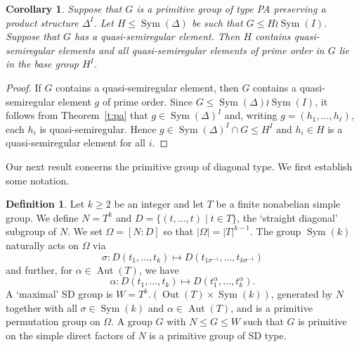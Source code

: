\documentclass{article}
\newtheorem{cor}[thm]{Corollary}
\theoremstyle{remark}
\theoremstyle{definition}
\newtheorem{defn}[thm]{Definition}
\DeclareMathOperator{\Sym}{Sym}
\DeclareMathOperator{\Aut}{Aut}
\DeclareMathOperator{\Out}{Out}
\newcommand{\qsr}{quasi-semiregular}
\newcommand{\qsre}{quasi-semiregular element}
\newcommand{\qsres}{quasi-semiregular elements}
\begin{document}
\begin{cor}
\label{cor: pa groups}
Suppose that $G$ is a primitive group of type PA preserving a product structure $\Delta^I$. Let $H\leqslant \Sym(\Delta)$ be such that $G \leqslant H \wr \Sym(I)$. Suppose that $G$ has a {\qsre}. Then $H$ contains {\qsres} and all {\qsres} of prime order in $G$ lie in the base group $H^I$.
\end{cor}
\begin{proof}
 If $G$ contains a {\qsre}, then $G$ contains a  {\qsre} $g$ of prime order. Since $G \leqslant \Sym(\Delta)\wr \Sym(I)$, it follows from Theorem~\ref{t:pa} that   $g\in \Sym(\Delta)^I$ and, writing $g=(h_1,\ldots,h_\ell)$, each $h_i$ is {\qsr}. Hence $g\in \Sym(\Delta)^I \cap G \leqslant H^I$ and $h_i \in H$ is a {\qsre} for all $i$.
\end{proof}



Our next result concerns the primitive group of diagonal type. We first establish some notation.

\begin{defn}
Let $k\geqslant 2$ be an integer and let $T$ be a finite nonabelian simple group. We define $N=T^k$ and $D=\{(t,\ldots,t) \mid t \in T\}$, the `straight diagonal' subgroup of $N$. We set $\Omega =[N:D]$ so that $|\Omega|=|T|^{k-1}$. The group $\Sym(k)$ naturally acts on $\Omega$  via
$$\sigma  : D(t_1,\ldots,t_k) \mapsto D(t_{1\sigma^{-1}},\ldots,t_{k\sigma^{-1}})$$
and further, for  $\alpha \in \Aut(T)$, we have
$$\alpha : D(t_1,\ldots,t_k) \mapsto D(t_1^\alpha,\ldots,t_k^\alpha).$$
A `maximal'  SD group is $W = T^k.(\Out(T) \times \Sym(k))$,  generated by $N$ together with all $\sigma\in\Sym(k)$ and $\alpha\in \Aut(T)$,    and is a  primitive permutation group on $\Omega$. A  group  $G$ with  $N \leqslant G \leqslant W$  such that $G$ is  primitive  on the simple direct factors of $N$ is  a primitive  group   of SD  type. \end{defn}
\end{document}

